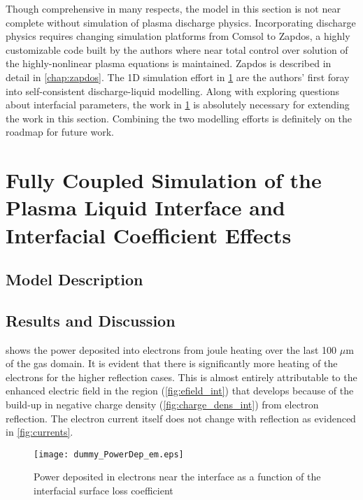 Though comprehensive in many respects, the model in this section is not near complete without simulation of plasma discharge physics. Incorporating discharge physics requires changing simulation platforms from Comsol to Zapdos, a highly customizable code built by the authors where near total control over solution of the highly-nonlinear plasma equations is maintained. Zapdos is described in detail in \cref{chap:zapdos}. The 1D simulation effort in \cref{sec:plasliq} are the authors' first foray into self-consistent discharge-liquid modelling. Along with exploring questions about interfacial parameters, the work in \cref{sec:plasliq} is absolutely necessary for extending the work in this section. Combining the two modelling efforts is definitely on the roadmap for future work.

\FloatBarrier

\section{Fully Coupled Simulation of the Plasma Liquid Interface and Interfacial Coefficient Effects}
\label{sec:plasliq}

\subsection{Model Description}
\label{sec:model}

\FloatBarrier

\subsection{Results and Discussion}
\label{sec:plasliq_results}



 shows the power deposited into electrons from joule heating over the last 100 $\mu$m of the gas domain. It is evident that there is significantly more heating of the electrons for the higher reflection cases. This is almost entirely attributable to the enhanced electric field in the region (\cref{fig:efield_int}) that develops because of the build-up in negative charge density (\cref{fig:charge_dens_int}) from electron reflection. The electron current itself does not change with reflection as evidenced in \cref{fig:currents}.

\begin{figure}[htpb]
  \centering
  \texttt{[image: dummy\_PowerDep\_em.eps]}
  \caption{Power deposited in electrons near the interface as a function of the interfacial surface loss coefficient}
  \label{fig:powerDep_em_int}
\end{figure}

